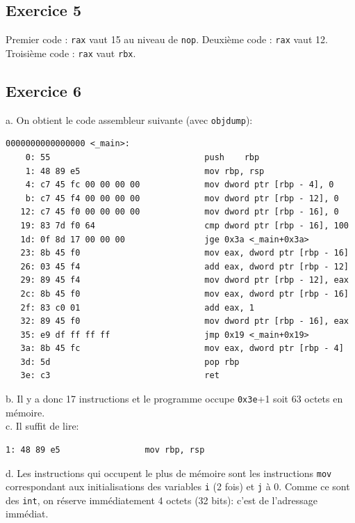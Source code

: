 \documentclass[11pt, a4 paper]{article}
\begin{document}
\subsection{Exercice 5}
Premier code : \texttt{rax} vaut 15 au niveau de \texttt{nop}.
Deuxième code : \texttt{rax} vaut 12.
Troisième code : \texttt{rax} vaut \texttt{rbx}.

\subsection{Exercice 6}
a. On obtient le code assembleur suivante (avec \texttt{objdump}):
\begin{lstlisting}[basicstyle=\ttfamily\footnotesize]
0000000000000000 <_main>:
    0: 55                           	push	rbp
    1: 48 89 e5                     	mov	rbp, rsp
    4: c7 45 fc 00 00 00 00         	mov	dword ptr [rbp - 4], 0
    b: c7 45 f4 00 00 00 00         	mov	dword ptr [rbp - 12], 0
   12: c7 45 f0 00 00 00 00         	mov	dword ptr [rbp - 16], 0
   19: 83 7d f0 64                  	cmp	dword ptr [rbp - 16], 100
   1d: 0f 8d 17 00 00 00            	jge	0x3a <_main+0x3a>
   23: 8b 45 f0                     	mov	eax, dword ptr [rbp - 16]
   26: 03 45 f4                     	add	eax, dword ptr [rbp - 12]
   29: 89 45 f4                     	mov	dword ptr [rbp - 12], eax
   2c: 8b 45 f0                     	mov	eax, dword ptr [rbp - 16]
   2f: 83 c0 01                     	add	eax, 1
   32: 89 45 f0                     	mov	dword ptr [rbp - 16], eax
   35: e9 df ff ff ff               	jmp	0x19 <_main+0x19>
   3a: 8b 45 fc                     	mov	eax, dword ptr [rbp - 4]
   3d: 5d                           	pop	rbp
   3e: c3                           	ret
\end{lstlisting}

b. Il y a donc 17 instructions et le programme occupe \texttt{0x3e}+1 soit 63 octets en mémoire.\\

c. Il suffit de lire:
\begin{center}
\begin{lstlisting}[style=customasm]
1: 48 89 e5             	mov	rbp, rsp
\end{lstlisting}
\end{center}

d. Les instructions qui occupent le plus de mémoire sont les instructions \texttt{mov} correspondant aux initialisations des variables \texttt{i} (2 fois) et \texttt{j} à 0.
Comme ce sont des \texttt{int}, on réserve immédiatement 4 octets (32 bits): c'est de l'adressage immédiat.
\end{document}
